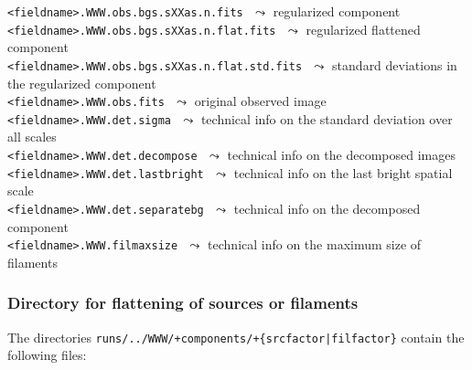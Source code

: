 \documentclass[a4paper,10pt]{article}
\begin{document}
{\small\verb!<fieldname>.WWW.obs.bgs.sXXas.n.fits!} $\,\,\leadsto$ regularized component\\
{\small\verb!<fieldname>.WWW.obs.bgs.sXXas.n.flat.fits!} $\,\,\leadsto$ regularized flattened component\\
{\small\verb!<fieldname>.WWW.obs.bgs.sXXas.n.flat.std.fits!} $\,\,\leadsto$ standard deviations in the regularized component\\
{\small\verb!<fieldname>.WWW.obs.fits!} $\,\,\leadsto$ original observed image\\
{\small\verb!<fieldname>.WWW.det.sigma!} $\,\,\leadsto$ technical info on the standard deviation over all scales\\
{\small\verb!<fieldname>.WWW.det.decompose!} $\,\,\leadsto$ technical info on the decomposed images\\
{\small\verb!<fieldname>.WWW.det.lastbright!} $\,\,\leadsto$ technical info on the last bright spatial scale\\
{\small\verb!<fieldname>.WWW.det.separatebg!} $\,\,\leadsto$ technical info on the decomposed component\\
{\small\verb!<fieldname>.WWW.filmaxsize!} $\,\,\leadsto$ technical info on the maximum size of filaments

\subsubsection{Directory for flattening of sources or filaments}
\label{flatten}

The directories \verb!runs/../WWW/+components/+{srcfactor|filfactor}! contain the following files:\\
\end{document}
